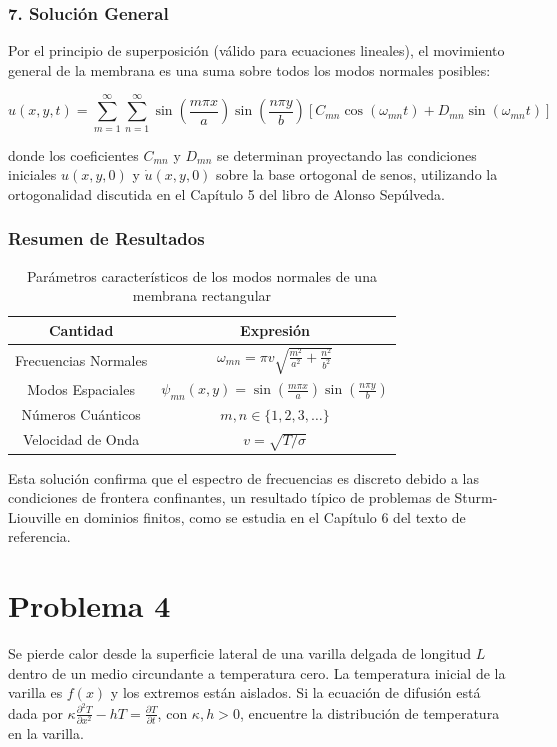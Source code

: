 \documentclass[a4paper]{article}
\begin{document}
\subsubsection{7. Solución General}

Por el principio de superposición (válido para ecuaciones lineales), el movimiento general de la membrana es una suma sobre todos los modos normales posibles:

\begin{equation}
u(x, y, t) = \sum_{m=1}^{\infty} \sum_{n=1}^{\infty} \sin\left(\frac{m \pi x}{a}\right) \sin\left(\frac{n \pi y}{b}\right) \left[ C_{mn} \cos(\omega_{mn} t) + D_{mn} \sin(\omega_{mn} t) \right]
\end{equation}

donde los coeficientes $C_{mn}$ y $D_{mn}$ se determinan proyectando las condiciones iniciales $u(x, y, 0)$ y $\dot{u}(x, y, 0)$ sobre la base ortogonal de senos, utilizando la ortogonalidad discutida en el Capítulo 5 del libro de Alonso Sepúlveda.

\subsubsection{Resumen de Resultados}

\begin{table}[h]
\centering
\begin{tabular}{|c|c|}
\hline
\textbf{Cantidad} & \textbf{Expresión} \\
\hline
Frecuencias Normales & $\omega_{mn} = \pi v \sqrt{\frac{m^2}{a^2} + \frac{n^2}{b^2}}$ \\
\hline
Modos Espaciales & $\psi_{mn}(x, y) = \sin\left(\frac{m \pi x}{a}\right) \sin\left(\frac{n \pi y}{b}\right)$ \\
\hline
Números Cuánticos & $m, n \in \{1, 2, 3, \dots\}$ \\
\hline
Velocidad de Onda & $v = \sqrt{T/\sigma}$ \\
\hline
\end{tabular}
\caption{Parámetros característicos de los modos normales de una membrana rectangular}
\end{table}

Esta solución confirma que el espectro de frecuencias es discreto debido a las condiciones de frontera confinantes, un resultado típico de problemas de Sturm-Liouville en dominios finitos, como se estudia en el Capítulo 6 del texto de referencia.


\section{Problema 4}
Se pierde calor desde la superficie lateral de una varilla delgada de longitud $L$ dentro de un medio circundante a temperatura cero. La temperatura inicial de la varilla es $f(x)$ y los extremos están aislados. Si la ecuación de difusión está dada por $\kappa \frac{\partial^2 T}{\partial x^2} - hT = \frac{\partial T}{\partial t}$, con $\kappa, h > 0$, encuentre la distribución de temperatura en la varilla.
\end{document}
